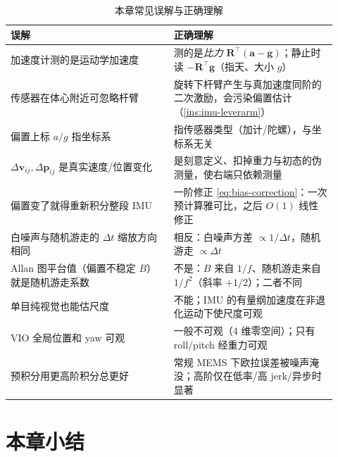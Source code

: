 \begin{table}[H]\centering\small
\caption{本章常见误解与正确理解}
\begin{tabular}{p{0.46\linewidth}p{0.46\linewidth}}
\toprule
误解 & 正确理解 \\
\midrule
加速度计测的是运动学加速度 & 测的是\emph{比力} $\mathbf R^\top(\mathbf a-\mathbf g)$；静止时读 $-\mathbf R^\top\mathbf g$（指天、大小 $g$） \\
传感器在体心附近可忽略杆臂 & 旋转下杆臂产生与真加速度同阶的二次激励，会污染偏置估计（\cref{ins:imu-leverarm}）\\
偏置上标 $a/g$ 指坐标系 & 指传感器类型（加计/陀螺），与坐标系无关 \\
$\Delta\mathbf v_{ij},\Delta\mathbf p_{ij}$ 是真实速度/位置变化 & 是刻意定义、扣掉重力与初态的伪测量，使右端只依赖测量 \\
偏置变了就得重新积分整段 IMU & 一阶修正 \cref{eq:bias-correction}：一次预计算雅可比，之后 $O(1)$ 线性修正 \\
白噪声与随机游走的 $\Delta t$ 缩放方向相同 & 相反：白噪声方差 $\propto1/\Delta t$，随机游走 $\propto\Delta t$ \\
Allan 图平台值（偏置不稳定 $B$）就是随机游走系数 & 不是：$B$ 来自 $1/f$、随机游走来自 $1/f^2$（斜率 $+1/2$）；二者不同 \\
单目纯视觉也能估尺度 & 不能；IMU 的有量纲加速度在非退化运动下使尺度可观 \\
VIO 全局位置和 yaw 可观 & 一般不可观（4 维零空间）；只有 roll/pitch 经重力可观 \\
预积分用更高阶积分总更好 & 常规 MEMS 下欧拉误差被噪声淹没；高阶仅在低率/高 jerk/异步时显著 \\
\bottomrule
\end{tabular}
\end{table}

\section*{本章小结}


